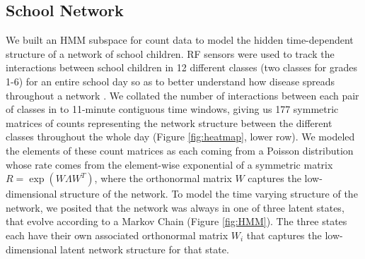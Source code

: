 \documentclass{article}
\begin{document}
\subsection{School Network}
We built an HMM subspace for count data to model the hidden time-dependent structure of a network of school children. RF sensors were used to track the interactions between school children in 12 different classes (two classes for grades 1-6) for an entire school day so as to better understand how disease spreads throughout a network \citep{stehle2011high}. We collated the number of interactions between each pair of classes in to 11-minute contiguous time windows, giving us 177 symmetric matrices of counts representing the network structure between the different classes throughout the whole day (Figure \ref{fig:heatmap}, lower row). We modeled the elements of these count matrices as each coming from a Poisson distribution whose rate comes from the element-wise exponential of a symmetric matrix $R = \exp (W \Lambda W^T)$, where the orthonormal matrix $W$ captures the low-dimensional structure of the network. To model the time varying structure of the network, we posited that the network was always in one of three latent states, that evolve according to a Markov Chain (Figure \ref{fig:HMM}). The three states each have their own associated orthonormal matrix $W_i$ that captures the low-dimensional latent network structure for that state.
\end{document}
